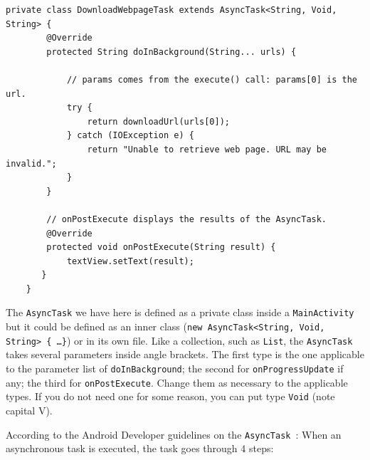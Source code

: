 \begin{verbatim}
private class DownloadWebpageTask extends AsyncTask<String, Void, String> {
        @Override
        protected String doInBackground(String... urls) {
              
            // params comes from the execute() call: params[0] is the url.
            try {
                return downloadUrl(urls[0]);
            } catch (IOException e) {
                return "Unable to retrieve web page. URL may be invalid.";
            }
        }
        
        // onPostExecute displays the results of the AsyncTask.
        @Override
        protected void onPostExecute(String result) {
            textView.setText(result);
       }
    }
\end{verbatim}

The \texttt{AsyncTask} we have here is defined as a private class inside a \texttt{MainActivity} but it could be defined as an inner class (\texttt{new AsyncTask<String, Void, String> \{ \ldots \}}) or in its own file. Like a collection, such as \texttt{List}, the \texttt{AsyncTask} takes several parameters inside angle brackets. The first type is the one applicable to the parameter list of \texttt{doInBackground}; the second for \texttt{onProgressUpdate} if any; the third for \texttt{onPostExecute}. Change them as necessary to the applicable types. If you do not need one for some reason, you can put type \texttt{Void} (note capital V).

According to the Android Developer guidelines on the \texttt{AsyncTask}~\cite{asynctask}:
When an asynchronous task is executed, the task goes through 4 steps:

